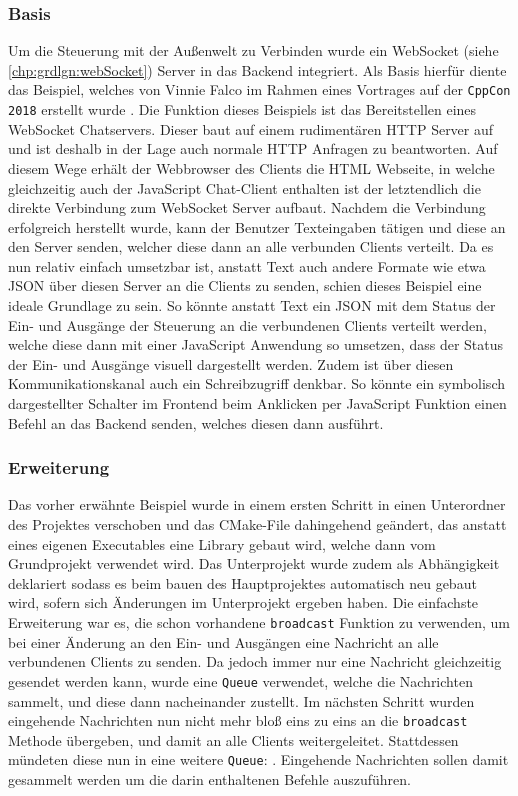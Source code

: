 \subsubsection{Basis}
Um die Steuerung mit der Außenwelt zu Verbinden wurde ein WebSocket (siehe \ref{chp:grdlgn:webSocket}) Server in das Backend integriert. Als Basis hierfür diente das Beispiel, welches von Vinnie Falco im  Rahmen eines Vortrages auf der \texttt{CppCon 2018} erstellt wurde \cite{URL:WebSocketCppCon}. Die Funktion dieses Beispiels ist das Bereitstellen  eines WebSocket Chatservers. Dieser baut auf einem rudimentären HTTP Server auf und ist deshalb in der Lage auch normale HTTP Anfragen zu beantworten. Auf diesem Wege erhält der Webbrowser des Clients die HTML Webseite, in welche gleichzeitig auch der JavaScript Chat-Client enthalten ist der letztendlich die direkte Verbindung zum WebSocket Server aufbaut. Nachdem die Verbindung erfolgreich herstellt wurde, kann der Benutzer Texteingaben tätigen und diese an den Server senden, welcher diese dann an alle verbunden Clients verteilt. Da es nun relativ einfach umsetzbar ist, anstatt Text auch andere Formate wie etwa JSON über diesen Server an die Clients zu senden, schien dieses Beispiel eine ideale Grundlage zu sein. So könnte anstatt Text ein JSON mit dem Status der Ein- und Ausgänge der Steuerung an die verbundenen Clients verteilt werden, welche diese dann mit einer JavaScript Anwendung so umsetzen, dass der Status der Ein- und Ausgänge visuell dargestellt werden. Zudem ist über diesen Kommunikationskanal auch ein Schreibzugriff denkbar. So könnte ein symbolisch dargestellter Schalter im Frontend beim Anklicken per JavaScript Funktion einen Befehl an das Backend senden, welches diesen dann ausführt. 
\subsubsection{Erweiterung}
Das vorher erwähnte Beispiel wurde in einem ersten Schritt in einen Unterordner des Projektes verschoben und das CMake-File dahingehend geändert, das anstatt eines eigenen Executables eine Library gebaut wird, welche dann vom Grundprojekt verwendet wird. Das Unterprojekt wurde zudem als Abhängigkeit deklariert sodass es beim bauen des Hauptprojektes automatisch neu gebaut wird, sofern sich Änderungen im Unterprojekt ergeben haben. Die einfachste Erweiterung war es, die schon vorhandene \texttt{broadcast} Funktion zu verwenden, um bei einer Änderung an den Ein- und Ausgängen eine Nachricht an alle verbundenen Clients zu senden. Da jedoch immer nur eine Nachricht gleichzeitig gesendet werden kann, wurde eine \texttt{Queue} verwendet, welche die Nachrichten sammelt, und diese dann  nacheinander zustellt. Im nächsten Schritt wurden eingehende Nachrichten nun nicht mehr bloß eins zu eins an die \texttt{broadcast} Methode übergeben, und damit an alle Clients weitergeleitet. Stattdessen mündeten diese nun in eine weitere \texttt{Queue}: . Eingehende Nachrichten sollen damit gesammelt werden um die darin enthaltenen Befehle auszuführen.
